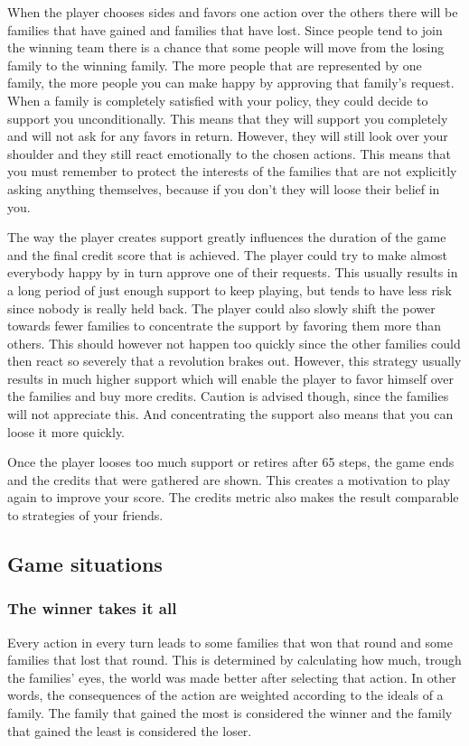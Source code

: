 \documentclass[11pt,a4paper]{article}
\begin{document}
When the player chooses sides and favors one action over the others there will be families that have gained and families that have lost. Since people tend to join the winning team there is a chance that some people will move from the losing family to the winning family. The more people that are represented by one family, the more people you can make happy by approving that family's request. When a family is completely satisfied with your policy, they could decide to support you unconditionally. This means that they will support you completely and will not ask for any favors in return. However, they will still look over your shoulder and they still react emotionally to the chosen actions. This means that you must remember to protect the interests of the families that are not explicitly asking anything themselves, because if you don't they will loose their belief in you.

The way the player creates support greatly influences the duration of the game and the final credit score that is achieved. The player could try to make almost everybody happy by in turn approve one of their requests. This usually results in a long period of just enough support to keep playing, but tends to have less risk since nobody is really held back. The player could also slowly shift the power towards fewer families to concentrate the support by favoring them more than others. This should however not happen too quickly since the other families could then react so severely that a revolution brakes out. However, this strategy usually results in much higher support which will enable the player to favor himself over the families and buy more credits. Caution is advised though, since the families will not appreciate this. And concentrating the support also means that you can loose it more quickly.

Once the player looses too much support or retires after 65 steps, the game ends and the credits that were gathered are shown. This creates a motivation to play again to improve your score. The credits metric also makes the result comparable to strategies of your friends.
\subsection{Game situations}

  \subsubsection{The winner takes it all}
Every action in every turn leads to some families that won that round and some families that lost that round. This is determined by calculating how much, trough the families' eyes, the world was made better after selecting that action. In other words, the consequences of the action are weighted according to the ideals of a family. The family that gained the most is considered the winner and the family that gained the least is considered the loser. 
\end{document}
